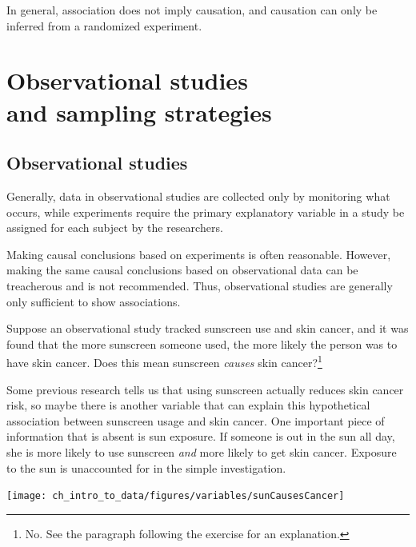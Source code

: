\begin{tipBox}{
In general, association does not imply causation, and causation can only be inferred from a randomized experiment.}
\end{tipBox}


\section[Observational studies and sampling strategies]{Observational studies \\and sampling strategies ~}

\subsection{Observational studies}

Generally, data in observational studies are collected only by monitoring what occurs, while experiments require the primary explanatory variable in a study be assigned for each subject by the researchers.

Making causal conclusions based on experiments is often reasonable. However, making the same causal conclusions based on observational data can be treacherous and is not recommended. Thus, observational studies are generally only sufficient to show associations.

\begin{exercise} \label{sunscreenLurkingExample}
Suppose an observational study tracked sunscreen use and skin cancer, and it was found that the more sunscreen someone used, the more likely the person was to have skin cancer. Does this mean sunscreen \emph{causes} skin cancer?\footnote{No. See the paragraph following the exercise for an explanation.}
\end{exercise}

Some previous research tells us that using sunscreen actually reduces skin cancer risk, so maybe there is another variable that can explain this hypothetical association between sunscreen usage and skin cancer. One important piece of information that is absent is sun exposure. If someone is out in the sun all day, she is more likely to use sunscreen \emph{and} more likely to get skin cancer. Exposure to the sun is unaccounted for in the simple investigation.
\begin{center}
\texttt{[image: ch\_intro\_to\_data/figures/variables/sunCausesCancer]}
\end{center}

